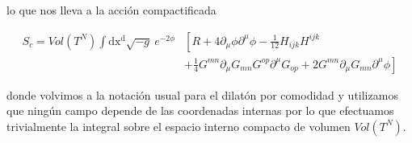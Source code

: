 \documentclass{article}
\numberwithin{equation}{section}
\begin{document}
lo que nos lleva a la acción compactificada\\

\begin{boxquation}
\begin{equation}\label{S_determinante}
\begin{aligned}
S_c =Vol\left(T^N\right) \int\mathrm{dx^d} \sqrt{-g} \ e^{-2\phi}&\left[R + 4 \partial_{\mu}\phi\partial^{\mu} \phi   - \frac{1}{12} H_{i j k}H^{i j k} \right.\\
&\left.+ \frac{1}{4} G^{m n} \partial_{\mu}{G_{m n}} G^{o p} \partial^{\mu}{G_{o p}} + 2 G^{m n} \partial_{\mu}G_{m n} \partial^{\mu} \phi \right]
\end{aligned}
\end{equation}
\end{boxquation}

donde volvimos a la notación usual para el dilatón por comodidad y utilizamos que ningún campo depende de las coordenadas internas por lo que efectuamos trivialmente la integral sobre el espacio interno compacto de volumen $ Vol\left(T^N\right) $.\\

%
%
\end{document}
